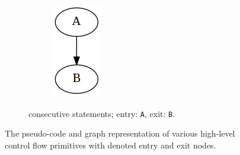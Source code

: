 \begin{figure}[htbp]
\begin{subfigure}[ht]{0.30\textwidth}
	\end{subfigure}
	\qquad
	\begin{subfigure}[ht]{0.24\textwidth}
		\centering
		\begin{subfigure}[ht]{0.20\textwidth}
			
		\end{subfigure}
		\begin{subfigure}[ht]{0.35\textwidth}
			\includegraphics[width=\textwidth]{inc/primitives/list.png}
		\end{subfigure}
		\caption{consecutive statements; entry: \texttt{A}, exit: \texttt{B}.}
		\label{fig:list_graph_representation}
	\end{subfigure}
	\caption{The pseudo-code and graph representation of various high-level control flow primitives with denoted entry and exit nodes.}
	\label{fig:graph_representations}
\end{figure}
